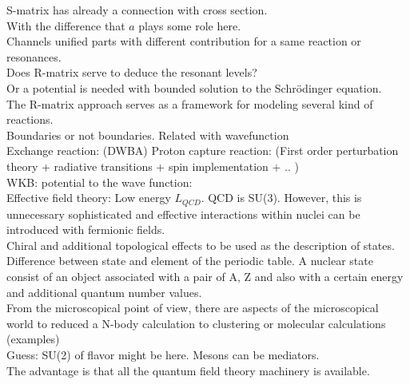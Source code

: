 \documentclass[openany]{book}
\begin{document}
S-matrix has already a connection with cross section. \\

With the difference that $a$ plays some role here.  \\

Channels unified parts with different contribution for a same reaction or resonances.  \\

Does R-matrix serve to deduce the resonant levels?  \\

Or a potential is needed with bounded solution to the Schrödinger equation.   \\

The R-matrix approach serves as a framework for modeling several kind of reactions.  \\

Boundaries or not boundaries. Related with wavefunction  \\

Exchange reaction: (DWBA)
Proton capture reaction: (First order perturbation theory + radiative transitions + spin implementation + .. ) \\

WKB: potential to the wave function: \\

Effective field theory: Low energy $L_{QCD}$. 
QCD is SU(3). However, this is unnecessary sophisticated and effective interactions within nuclei can be introduced with fermionic fields.  \\

Chiral and additional topological effects to be used as the description of states. \\
 
Difference between state and element of the periodic table. A nuclear state consist of an object associated with a pair of A, Z and also  with a certain energy and additional quantum number values. \\

From the microscopical point of view, there are aspects of the microscopical world to reduced a N-body calculation to  clustering or molecular calculations (examples) \\

Guess: SU(2) of flavor might be here. Mesons can be mediators. \\

The advantage is that all the quantum field theory machinery is available. \\
\end{document}
